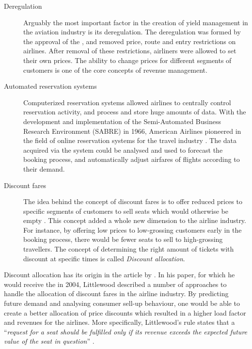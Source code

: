 \begin{description}
\item[Deregulation]
Arguably the most important factor in the creation of yield management in the aviation industry is its deregulation. The deregulation was formed by the approval of the , and removed price, route and entry restrictions on airlines. After removal of these restrictions, airliners were allowed to set their own prices. The ability to change prices for different segments of customers is one of the core concepts of revenue management.

\item[Automated reservation systems]
Computerized reservation systems allowed airlines to centrally control reservation activity, and process and store huge amounts of data. With the development and implementation of the Semi-Automated Business Research Environment (SABRE) in 1966, American Airlines pioneered in the field of online reservation systems for the travel industry \cite{voneche2005yield}. The data acquired via the system could be analysed and used to forecast the booking process, and automatically adjust airfares of flights according to their demand.

\item[Discount fares]
The idea behind the concept of discount fares is to offer reduced prices to specific segments of customers to sell seats which would otherwise be empty \cite{belobaba1987survey}. This concept added a whole new dimension to the airline industry. For instance, by offering low prices to low-grossing customers early in the booking process, there would be fewer seats to sell to high-grossing travellers. The concept of determining the right amount of tickets with discount at specific times is called \emph{Discount allocation}.
\end{description}

Discount allocation has its origin in the article by . In his paper, for which he would receive the  in 2004, Littlewood described a number of approaches to handle the allocation of discount fares in the airline industry. By predicting future demand and analysing consumer sell-up behaviour, one would be able to create a better allocation of price discounts which resulted in a higher load factor and revenues for the airlines. More specifically, Littlewood's rule states that a ``\textit{request for a seat should be fulfilled only if its revenue exceeds the expected future value of the seat in question}'' \cite[pp. 17]{wright2010dynamic}.

